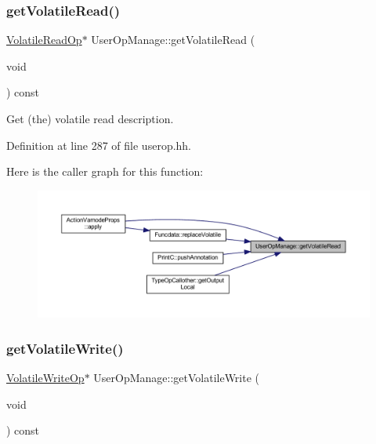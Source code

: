 \subsubsection{\texorpdfstring{getVolatileRead()}{getVolatileRead()}}
{\footnotesize\ttfamily \mbox{\hyperlink{class_volatile_read_op}{Volatile\+Read\+Op}}$\ast$ User\+Op\+Manage\+::get\+Volatile\+Read (\begin{DoxyParamCaption}\item[{void}]{ }\end{DoxyParamCaption}) const\hspace{0.3cm}{\ttfamily [inline]}}



Get (the) volatile read description. 



Definition at line 287 of file userop.\+hh.

Here is the caller graph for this function\+:
\nopagebreak
\begin{figure}[H]
\begin{center}
\leavevmode
\includegraphics[width=350pt]{class_user_op_manage_a200fcd7fcd664e36bb390509170cd4f6_icgraph}
\end{center}
\end{figure}
\mbox{\label{class_user_op_manage_a4ab2f5390f4f289a39328737615dce57}} 
\subsubsection{\texorpdfstring{getVolatileWrite()}{getVolatileWrite()}}
{\footnotesize\ttfamily \mbox{\hyperlink{class_volatile_write_op}{Volatile\+Write\+Op}}$\ast$ User\+Op\+Manage\+::get\+Volatile\+Write (\begin{DoxyParamCaption}\item[{void}]{ }\end{DoxyParamCaption}) const\hspace{0.3cm}{\ttfamily [inline]}}



